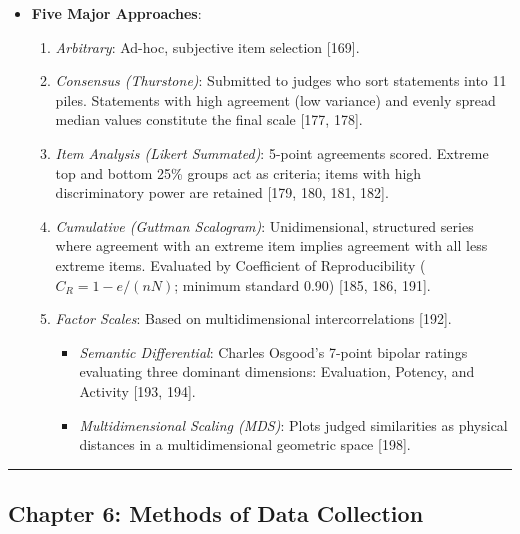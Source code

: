 \documentclass[
]{article}
\providecommand{\tightlist}{%
  \setlength{\itemsep}{0pt}\setlength{\parskip}{0pt}}
\begin{document}
\begin{itemize}
\tightlist
\item
  \textbf{Five Major Approaches}:

  \begin{enumerate}
  \def\labelenumi{\arabic{enumi}.}
  \tightlist
  \item
    \emph{Arbitrary}: Ad-hoc, subjective item selection {[}169{]}.
  \item
    \emph{Consensus (Thurstone)}: Submitted to judges who sort
    statements into 11 piles. Statements with high agreement (low
    variance) and evenly spread median values constitute the final scale
    {[}177, 178{]}.
  \item
    \emph{Item Analysis (Likert Summated)}: 5-point agreements scored.
    Extreme top and bottom 25\% groups act as criteria; items with high
    discriminatory power are retained {[}179, 180, 181, 182{]}.
  \item
    \emph{Cumulative (Guttman Scalogram)}: Unidimensional, structured
    series where agreement with an extreme item implies agreement with
    all less extreme items. Evaluated by Coefficient of Reproducibility
    (\(C_R = 1 - e/(nN)\); minimum standard 0.90) {[}185, 186, 191{]}.
  \item
    \emph{Factor Scales}: Based on multidimensional intercorrelations
    {[}192{]}.

    \begin{itemize}
    \tightlist
    \item
      \emph{Semantic Differential}: Charles Osgood's 7-point bipolar
      ratings evaluating three dominant dimensions: Evaluation, Potency,
      and Activity {[}193, 194{]}.
    \item
      \emph{Multidimensional Scaling (MDS)}: Plots judged similarities
      as physical distances in a multidimensional geometric space
      {[}198{]}.
    \end{itemize}
  \end{enumerate}
\end{itemize}

\begin{center}\rule{0.5\linewidth}{0.5pt}\end{center}

\subsection{Chapter 6: Methods of Data
Collection}\label{chapter-6-methods-of-data-collection}
\end{document}
